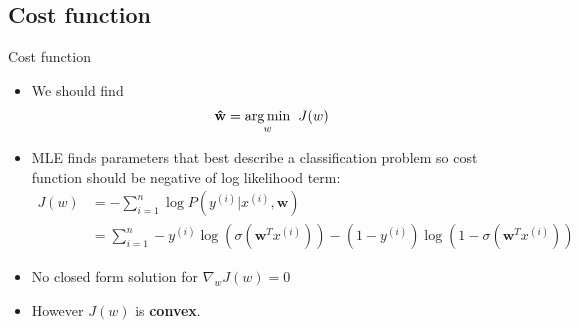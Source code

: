 \documentclass[serif, aspectratio=169]{beamer}
\begin{document}
\subsection{Cost function}
\begin{frame}{Cost function}
    \begin{itemize}
    \item We should find 
        \begin{align*}
            \mathbf{\hat{w}} = \underset{w}{\arg\min} \hspace{0.2cm} J(w)
        \end{align*}
        \item MLE finds parameters that best describe a classification problem so cost function should be negative of log likelihood term:
        \begin{align*}
            J(w) &= -\sum_{i=1}^{n} \log P(y^{(i)}|x^{(i)}, \mathbf{w})\\
            &= \sum_{i=1}^{n}-y^{(i)}\log (\sigma (\mathbf{w}^T x^{(i)})) - 
            (1-y^{(i)})\log (1 - \sigma (\mathbf{w}^T x^{(i)}))
        \end{align*}
        \item No closed form solution for $\nabla _w J(w) = 0$
        \item However $J(w)$ is \textbf{convex}.
    \end{itemize}
\end{frame}
\end{document}
